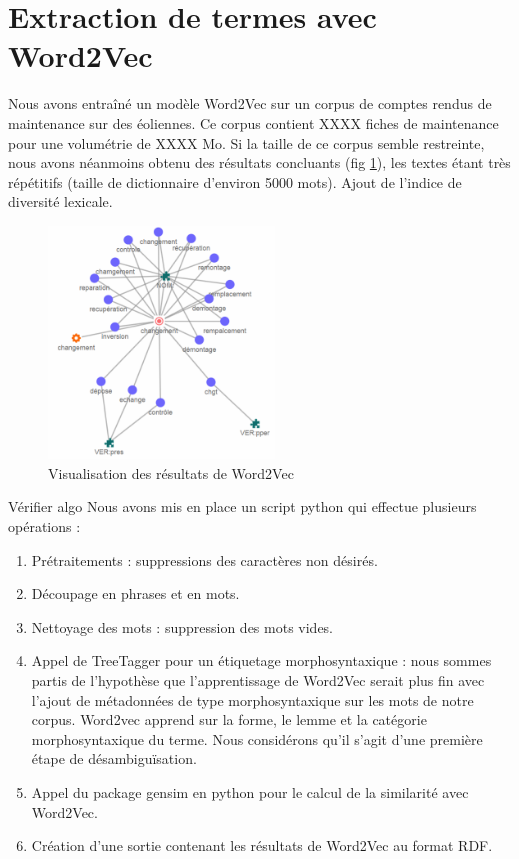 \section{Extraction de termes avec Word2Vec}
Nous avons entraîné un modèle Word2Vec sur un corpus de comptes rendus de maintenance sur des éoliennes. Ce corpus contient XXXX fiches de maintenance pour une volumétrie de XXXX Mo. Si la taille de ce corpus semble restreinte, nous avons néanmoins obtenu des résultats concluants (fig \ref{fig:w2v}), les textes étant très répétitifs (taille de dictionnaire d'environ 5000 mots). Ajout de l'indice de diversité lexicale.

\begin{figure}[tb]
    \begin{center}
        \includegraphics[width=6cm]{figures/w2v}
    \end{center}
    \caption{Visualisation des résultats de Word2Vec}\label{fig:w2v}
\end{figure}

Vérifier algo
Nous avons mis en place un script python qui effectue plusieurs opérations :
\begin{enumerate}

\item Prétraitements : suppressions des caractères non désirés.
\item Découpage en phrases et en mots.
\item Nettoyage des mots : suppression des mots vides.
\item Appel de TreeTagger \cite{Schmid94probabilisticpart-of-speech} pour un étiquetage morphosyntaxique : nous sommes partis de l'hypothèse que l'apprentissage de Word2Vec serait plus fin avec l'ajout de métadonnées de type morphosyntaxique sur les mots de notre corpus. Word2vec apprend sur la forme, le lemme et la catégorie morphosyntaxique du terme. Nous considérons qu'il s'agit d'une première étape de désambiguïsation.
\item Appel du package gensim en python pour le calcul de la similarité avec Word2Vec.
\item Création d'une sortie contenant les résultats de Word2Vec au format RDF.

\end{enumerate}
